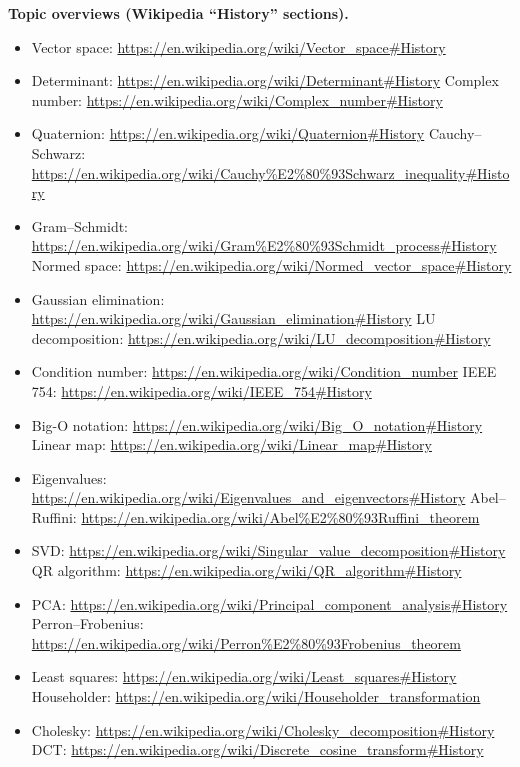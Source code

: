 \documentclass[11pt]{article}
\begin{document}
\textbf{Topic overviews (Wikipedia ``History'' sections).}
\begin{itemize}[leftmargin=1.4em,itemsep=1pt]
  \item Vector space: \url{https://en.wikipedia.org/wiki/Vector_space\#History}
  \item Determinant: \url{https://en.wikipedia.org/wiki/Determinant\#History} \quad
        Complex number: \url{https://en.wikipedia.org/wiki/Complex_number\#History}
  \item Quaternion: \url{https://en.wikipedia.org/wiki/Quaternion\#History} \quad
        Cauchy--Schwarz: \url{https://en.wikipedia.org/wiki/Cauchy\%E2\%80\%93Schwarz_inequality\#History}
  \item Gram--Schmidt: \url{https://en.wikipedia.org/wiki/Gram\%E2\%80\%93Schmidt_process\#History} \quad
        Normed space: \url{https://en.wikipedia.org/wiki/Normed_vector_space\#History}
  \item Gaussian elimination: \url{https://en.wikipedia.org/wiki/Gaussian_elimination\#History} \quad
        LU decomposition: \url{https://en.wikipedia.org/wiki/LU_decomposition\#History}
  \item Condition number: \url{https://en.wikipedia.org/wiki/Condition_number} \quad
        IEEE 754: \url{https://en.wikipedia.org/wiki/IEEE_754\#History}
  \item Big-O notation: \url{https://en.wikipedia.org/wiki/Big_O_notation\#History} \quad
        Linear map: \url{https://en.wikipedia.org/wiki/Linear_map\#History}
  \item Eigenvalues: \url{https://en.wikipedia.org/wiki/Eigenvalues_and_eigenvectors\#History} \quad
        Abel--Ruffini: \url{https://en.wikipedia.org/wiki/Abel\%E2\%80\%93Ruffini_theorem}
  \item SVD: \url{https://en.wikipedia.org/wiki/Singular_value_decomposition\#History} \quad
        QR algorithm: \url{https://en.wikipedia.org/wiki/QR_algorithm\#History}
  \item PCA: \url{https://en.wikipedia.org/wiki/Principal_component_analysis\#History} \quad
        Perron--Frobenius: \url{https://en.wikipedia.org/wiki/Perron\%E2\%80\%93Frobenius_theorem}
  \item Least squares: \url{https://en.wikipedia.org/wiki/Least_squares\#History} \quad
        Householder: \url{https://en.wikipedia.org/wiki/Householder_transformation}
  \item Cholesky: \url{https://en.wikipedia.org/wiki/Cholesky_decomposition\#History} \quad
        DCT: \url{https://en.wikipedia.org/wiki/Discrete_cosine_transform\#History}

\end{itemize}
\end{document}

